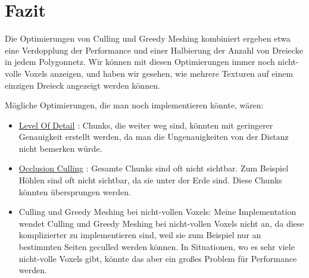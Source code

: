 \section{Fazit}

Die Optimierungen von Culling und Greedy Meshing
kombiniert ergeben etwa eine Verdopplung der
Performance und einer Halbierung der Anzahl
von Dreiecke in jedem Polygonnetz.
Wir können mit diesen Optimierungen
immer noch nicht-volle Voxels anzeigen,
und haben wir gesehen, wie mehrere Texturen
auf einem einzigen Dreieck angezeigt werden können.

\vspace{0.3cm}

Mögliche Optimierungen, die man noch implementieren
könnte, wären:
\begin{itemize}
	\item \href{https://de.wikipedia.org/wiki/Level_of_Detail}{Level Of Detail} \cite{lod}:
		Chunks, die weiter weg sind, könnten mit
		geringerer Genauigkeit erstellt werden,
		da man die Ungenauigkeiten von der Distanz
		nicht bemerken würde.
	\item \href{https://en.wikipedia.org/wiki/Hidden-surface_determination#Occlusion_culling}{Occlusion Culling} \cite{occlusion}:
		Gesamte Chunks sind oft nicht sichtbar.
		Zum Beispiel Höhlen sind oft nicht sichtbar,
		da sie unter der Erde sind. Diese Chunks
		könnten übersprungen werden.
	\item Culling und Greedy Meshing bei nicht-vollen Voxels:
		Meine Implementation wendet Culling und
		Greedy Meshing bei nicht-vollen Voxels
		nicht an, da diese komplizierter zu implementieren
		sind, weil sie zum Beispiel nur an bestimmten
		Seiten geculled werden können.
		In Situationen, wo es sehr viele nicht-volle
		Voxels gibt, könnte das aber ein großes Problem
		für Performance werden.
\end{itemize}
